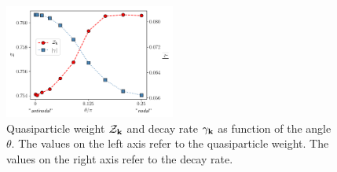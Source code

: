 \begin{figure}
\includegraphics[width=0.5\textwidth]{images/z_and_gamma975.png}
\caption{Quasiparticle weight $\mathcal{Z}_{\mathbf{k} }$ and decay rate $\gamma_{\bf{k}}$ as function of the angle $\theta$. 
The values on the left axis refer to the quasiparticle weight. The values on the right axis refer to the decay rate.}
\label{fig:zetaandgamma}
\end{figure}
